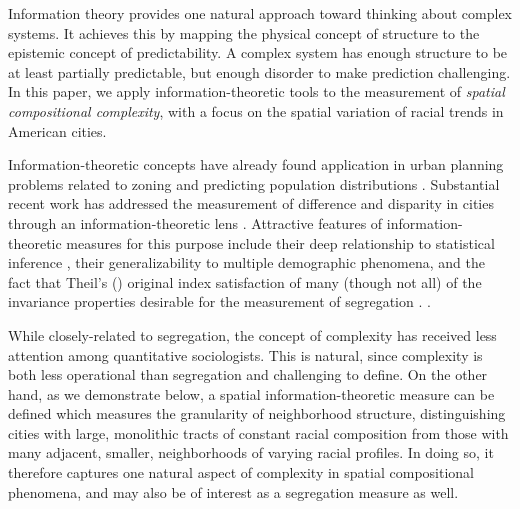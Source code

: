 	Information theory provides one natural approach toward thinking about complex systems. It achieves this by mapping the physical concept of structure to the epistemic concept of predictability. A complex system has enough structure to be at least partially predictable, but enough disorder to make prediction challenging. In this paper, we apply information-theoretic tools to the measurement of \emph{spatial compositional complexity}, with a focus on the spatial variation of racial trends in American cities. 

	Information-theoretic concepts have already found application in urban planning problems related to zoning and predicting population distributions \cite{Royal2014,Batty1974,Batty1976,Battya}. Substantial recent work has addressed the measurement of difference and disparity in cities through an information-theoretic lens \cite{Theil1971,Bettencourt2015,Roberto2015a,Roberto2015}. Attractive features of information-theoretic measures for this purpose include their deep relationship to statistical inference \cite{Cover1991,Csiszzr2004}, their generalizability to multiple demographic phenomena, and the fact that Theil's (\cite{Theil1971}) original index satisfaction of many (though not all) of the invariance properties desirable for the measurement of segregation \cite{Reardon2002}. \nocite{Sampson2002,Dietz2002,Wong2004,Keeling1999,Anas1997,Ioannides2004a,Wong1999,Press2009a,Holloway2012,Lee2008,Louf2015}.

	While closely-related to segregation, the concept of complexity has received less attention among quantitative sociologists. This is natural, since complexity is both less operational than segregation and challenging to define. On the other hand, as we demonstrate below, a spatial information-theoretic measure can be defined which measures the granularity of neighborhood structure, distinguishing cities with large, monolithic tracts of constant racial composition from those with many adjacent, smaller, neighborhoods of varying racial profiles. In doing so, it therefore captures one natural aspect of complexity in spatial compositional phenomena, and may also be of interest as a segregation measure as well. 
	
